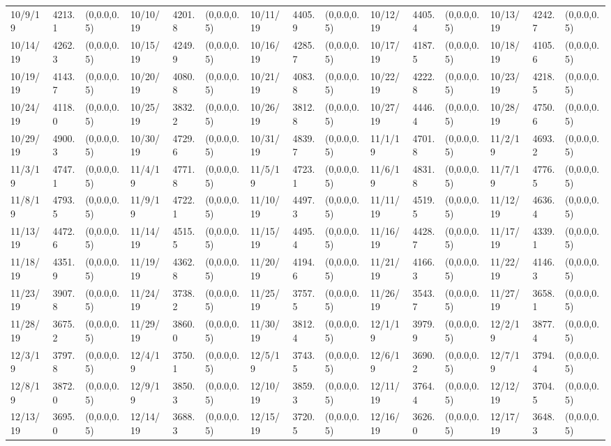 \documentclass[12pt]{article}
\begin{document}
\begin{table}
\begin{center}
\begin{tabular}{p{15pt}p{15pt}p{25pt}p{15pt}p{15pt}p{25pt}p{15pt}p{15pt}p{25pt}p{15pt}p{15pt}p{25pt}p{15pt}p{15pt}p{25pt}}
            10/9/19&4213.1&(0,0.0,0.5)&10/10/19&4201.8&(0,0.0,0.5)&10/11/19&4405.9&(0,0.0,0.5)&10/12/19&4405.4&(0,0.0,0.5)&10/13/19&4242.7&(0,0.0,0.5)\\
            10/14/19&4262.3&(0,0.0,0.5)&10/15/19&4249.9&(0,0.0,0.5)&10/16/19&4285.7&(0,0.0,0.5)&10/17/19&4187.5&(0,0.0,0.5)&10/18/19&4105.6&(0,0.0,0.5)\\
            10/19/19&4143.7&(0,0.0,0.5)&10/20/19&4080.8&(0,0.0,0.5)&10/21/19&4083.8&(0,0.0,0.5)&10/22/19&4222.8&(0,0.0,0.5)&10/23/19&4218.5&(0,0.0,0.5)\\
            10/24/19&4118.0&(0,0.0,0.5)&10/25/19&3832.2&(0,0.0,0.5)&10/26/19&3812.8&(0,0.0,0.5)&10/27/19&4446.4&(0,0.0,0.5)&10/28/19&4750.6&(0,0.0,0.5)\\
            10/29/19&4900.3&(0,0.0,0.5)&10/30/19&4729.6&(0,0.0,0.5)&10/31/19&4839.7&(0,0.0,0.5)&11/1/19&4701.8&(0,0.0,0.5)&11/2/19&4693.2&(0,0.0,0.5)\\
            11/3/19&4747.1&(0,0.0,0.5)&11/4/19&4771.8&(0,0.0,0.5)&11/5/19&4723.1&(0,0.0,0.5)&11/6/19&4831.8&(0,0.0,0.5)&11/7/19&4776.5&(0,0.0,0.5)\\
            11/8/19&4793.5&(0,0.0,0.5)&11/9/19&4722.1&(0,0.0,0.5)&11/10/19&4497.3&(0,0.0,0.5)&11/11/19&4519.5&(0,0.0,0.5)&11/12/19&4636.4&(0,0.0,0.5)\\
            11/13/19&4472.6&(0,0.0,0.5)&11/14/19&4515.5&(0,0.0,0.5)&11/15/19&4495.4&(0,0.0,0.5)&11/16/19&4428.7&(0,0.0,0.5)&11/17/19&4339.1&(0,0.0,0.5)\\
            11/18/19&4351.9&(0,0.0,0.5)&11/19/19&4362.8&(0,0.0,0.5)&11/20/19&4194.6&(0,0.0,0.5)&11/21/19&4166.3&(0,0.0,0.5)&11/22/19&4146.3&(0,0.0,0.5)\\
            11/23/19&3907.8&(0,0.0,0.5)&11/24/19&3738.2&(0,0.0,0.5)&11/25/19&3757.5&(0,0.0,0.5)&11/26/19&3543.7&(0,0.0,0.5)&11/27/19&3658.1&(0,0.0,0.5)\\
            11/28/19&3675.2&(0,0.0,0.5)&11/29/19&3860.0&(0,0.0,0.5)&11/30/19&3812.4&(0,0.0,0.5)&12/1/19&3979.9&(0,0.0,0.5)&12/2/19&3877.4&(0,0.0,0.5)\\
            12/3/19&3797.8&(0,0.0,0.5)&12/4/19&3750.1&(0,0.0,0.5)&12/5/19&3743.5&(0,0.0,0.5)&12/6/19&3690.2&(0,0.0,0.5)&12/7/19&3794.4&(0,0.0,0.5)\\
            12/8/19&3872.0&(0,0.0,0.5)&12/9/19&3850.3&(0,0.0,0.5)&12/10/19&3859.3&(0,0.0,0.5)&12/11/19&3764.4&(0,0.0,0.5)&12/12/19&3704.5&(0,0.0,0.5)\\
            12/13/19&3695.0&(0,0.0,0.5)&12/14/19&3688.3&(0,0.0,0.5)&12/15/19&3720.5&(0,0.0,0.5)&12/16/19&3626.0&(0,0.0,0.5)&12/17/19&3648.3&(0,0.0,0.5)\\

\end{tabular}
\end{center}
\end{table}
\end{document}
